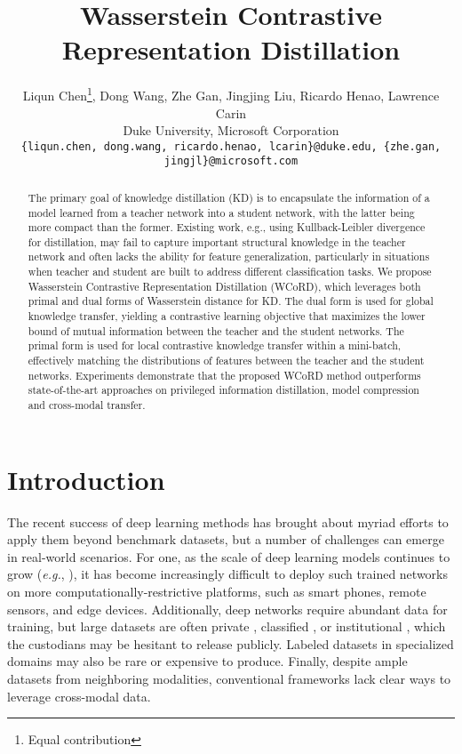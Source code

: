 \documentclass[final]{cvpr}
\theoremstyle{definition}
\begin{document}
\title{Wasserstein Contrastive Representation Distillation}

\author{Liqun Chen\thanks{Equal contribution}, Dong Wang, Zhe Gan,  Jingjing Liu, Ricardo Henao, Lawrence Carin\\
Duke University, \quad Microsoft Corporation\\
{\tt\small \{liqun.chen, dong.wang, ricardo.henao, lcarin\}@duke.edu, \{zhe.gan, jingjl\}@microsoft.com}
}

\maketitle


\begin{abstract}
The primary goal of knowledge distillation (KD) is to encapsulate the information of a model learned from a teacher network into a student network, with the latter being more compact than the former. Existing work, e.g., using Kullback-Leibler divergence for distillation, may fail to capture important structural knowledge in the teacher network and often lacks the ability for feature generalization, particularly in situations when teacher and student are built to address different classification tasks. We propose Wasserstein Contrastive Representation Distillation (WCoRD), which leverages both primal and dual forms of Wasserstein distance for KD. The dual form is used for global knowledge transfer, yielding a contrastive learning objective that maximizes the lower bound of mutual information between the teacher and the student networks. The primal form is used for local contrastive knowledge transfer within a mini-batch, effectively matching the distributions of features between the teacher and the student networks. Experiments demonstrate that the proposed WCoRD method outperforms state-of-the-art approaches on privileged information distillation, model compression and cross-modal transfer.
\end{abstract}
\vspace{-5mm}
\section{Introduction}

The recent success of deep learning methods has brought about myriad efforts to apply them beyond benchmark datasets, but a number of challenges can emerge in real-world scenarios.
For one, as the scale of deep learning models continues to grow (\textit{e.g.}, \cite{he2016identity, devlin2018bert}), it has become increasingly difficult to deploy such trained networks on more computationally-restrictive platforms, such as smart phones, remote sensors, and edge devices.
Additionally, deep networks require abundant data for training, but large datasets are often private \cite{ribli2018detecting}, classified \cite{liang2018automatic}, or institutional \cite{sun2017revisiting}, which the custodians may be hesitant to release publicly.
Labeled datasets in specialized domains may also be rare or expensive to produce. Finally, despite ample datasets from neighboring modalities, conventional frameworks lack clear ways to leverage cross-modal data.
\end{document}
